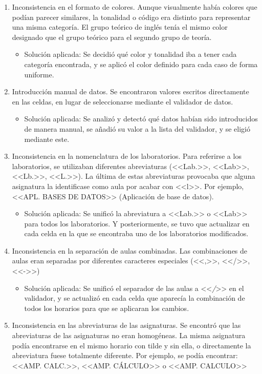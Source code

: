 \begin{enumerate}
	\item Inconsistencia en el formato de colores. Aunque visualmente había colores que podían parecer similares, la tonalidad o código era distinto para representar una misma categoría. El grupo teórico de inglés tenía el mismo color designado que el grupo teórico para el segundo grupo de teoría.
	\begin{itemize}
		\item Solución aplicada: Se decidió qué color y tonalidad iba a tener cada categoría encontrada, y se aplicó el color definido para cada caso de forma uniforme.
	\end{itemize}
	\item Introducción manual de datos. Se encontraron valores escritos directamente en las celdas, en lugar de seleccionarse mediante el validador de datos.
	\begin{itemize}
		\item Solución aplicada: Se analizó y detectó qué datos habían sido introducidos de manera manual, se añadió su valor a la lista del validador, y se eligió mediante este.
	\end{itemize}
	\item Inconsistencia en la nomenclatura de los laboratorios. Para referirse a los laboratorios, se utilizaban diferentes abreviaturas (<<Lab.>>, <<Lab>>, <<Lb.>>, <<L.>>). La última de estas abreviaturas provocaba que alguna asignatura la identificase como aula por acabar con <<l>>. Por ejemplo, <<APL. BASES DE DATOS>> (Aplicación de base de datos).
	\begin{itemize}
		\item Solución aplicada: Se unificó la abreviatura a <<Lab.>> o <<Lab>> para todos los laboratorios. Y posteriormente, se tuvo que actualizar en cada celda en la que se encontraba uno de los laboratorios modificados. 
	\end{itemize}
	\item Inconsistencia en la separación de aulas combinadas. Las combinaciones de aulas eran separadas por diferentes caracteres especiales (<<,>>, <</>>, <<->>)
	\begin{itemize}
		\item Solución aplicada: Se unificó el separador de las aulas a <<\textit{/}>> en el validador, y se actualizó en cada celda que aparecía la combinación de todos los horarios para que se aplicaran los cambios.
	\end{itemize}
	\item Inconsistencia en las abreviaturas de las asignaturas. Se encontró que las abreviaturas de las asignaturas no eran homogéneas. La misma asignatura podía encontrarse en el mismo horario con tilde y sin ella, o directamente la abreviatura fuese totalmente diferente. Por ejemplo, se podía encontrar: <<AMP. CALC.>>, <<AMP. CÁLCULO>> o <<AMP. CALCULO>>

\end{enumerate}
